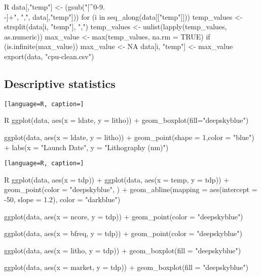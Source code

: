 \hypertarget{Listing 10}{}
\begin{lstlisting}[language=R, caption=Match numeric value; take the maximum number; export file as cleaned data]
\end{lstlisting}
\begin{code}{R}
data[,"temp"] <- (gsub("[^0-9.\\-]+", ",", data[,"temp"]))
for (i in seq_along(data[["temp"]])) {
    temp_values <- strsplit(data[i, "temp"], ",") 
    temp_values <- unlist(lapply(temp_values, as.numeric))
    max_value <- max(temp_values, na.rm = TRUE)
    if (is.infinite(max_value)) {
        max_value <- NA
    }
    data[i, "temp"] <- max_value
}
export(data, "cpu-clean.csv")

\end{code}


\subsection{Descriptive statistics}
\hypertarget{Listing 11}{}
\begin{lstlisting}[language=R, caption=]
\end{lstlisting}
\begin{code}{R}
ggplot(data, aes(x = ldate, y = litho)) +
  geom_boxplot(fill="deepskyblue")
    
ggplot(data, aes(x = ldate, y = litho)) +
    geom_point(shape = 1,color = "blue") +
    labs(x = "Launch Date", y = "Lithography (nm)")
\end{code}

\hypertarget{Listing 12}{}
\begin{lstlisting}[language=R, caption=]
\end{lstlisting}
\begin{code}{R}
    ggplot(data, aes(x = tdp)) +
 ggplot(data, aes(x = temp, y = tdp)) +
 geom_point(color = "deepskyblue", ) +
 geom_abline(mapping = aes(intercept = -50, slope = 1.2), color =
"darkblue")

 ggplot(data, aes(x = ncore, y = tdp)) +
 geom_point(color = "deepskyblue")

 ggplot(data, aes(x = bfreq, y = tdp)) +
 geom_point(color = "deepskyblue")

 ggplot(data, aes(x = litho, y = tdp)) +
 geom_boxplot(fill = "deepskyblue")

 ggplot(data, aes(x = market, y = tdp)) +
 geom_boxplot(fill = "deepskyblue")
\end{code}


